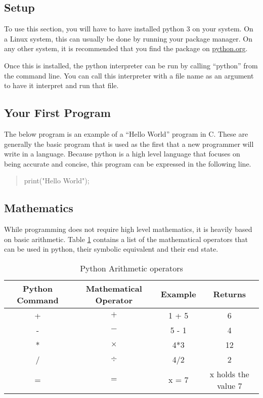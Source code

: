 		\subsection{Setup}
			To use this section, you will have to have installed python 3 on your system. 
			On a Linux system, this can usually be done by running your package manager. 
			On any other system, it is recommended that you find the package on \url{python.org}.

			Once this is installed, the python interpreter can be run by calling ``python'' from the command line. 
			You can call this interpreter with a file name as an argument to have it interpret and run that file. 

		\subsection{Your First Program}
			The below program is an example of a ``Hello World'' program in C. 
			These are generally the basic program that is used as the first that a new programmer will write in a language. 
			Because python is a high level language that focuses on being accurate and concise, this program can be expressed in the following line. 
			\begin{quote}
				print("Hello World");
			\end{quote}

		\subsection{Mathematics}
			While programming does not require high level mathematics, it is heavily based on basic arithmetic. 
			Table \ref{tab:PythonMaths} contains a list of the mathematical operators that can be used in python, their symbolic equivalent and their end state. 
			\begin{table}[htb]
				\centering
				\begin{adjustbox}{max width=1\textwidth}
				\begin{tabular}{|c|c|c|c|}
					\hline
					\textbf{Python Command} & \textbf{Mathematical Operator} & \textbf{Example} & \textbf{Returns} \\ \hline
					+ & $+$ & 1 + 5 & 6 \\ \hline
					- & $-$ & 5 - 1 & 4 \\ \hline
					* & $\times$ & 4*3 & 12 \\ \hline
					/ & $\div$ & 4/2 & 2 \\ \hline
					= & $=$ & x = 7 & x holds the value 7 \\ \hline 
				\end{tabular}
				\end{adjustbox}
				\caption{Python Arithmetic operators}
				\label{tab:PythonMaths}
			\end{table}
